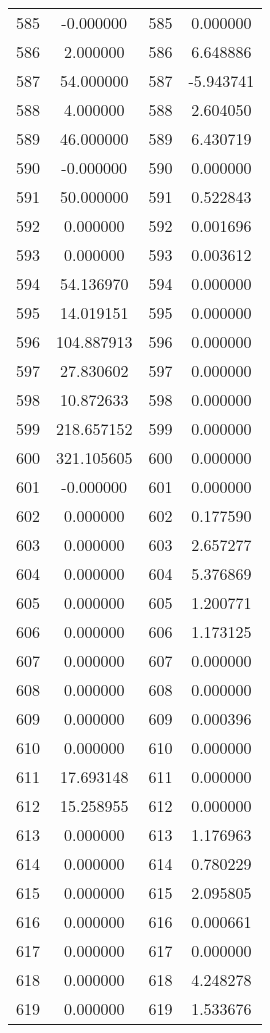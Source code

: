 \documentclass[12pt]{article}
\begin{document}
\begin{longtable}{@{}cccc@{}}
585 & -0.000000 & 585 & 0.000000 \\
586 & 2.000000 & 586 & 6.648886 \\
587 & 54.000000 & 587 & -5.943741 \\
588 & 4.000000 & 588 & 2.604050 \\
589 & 46.000000 & 589 & 6.430719 \\
590 & -0.000000 & 590 & 0.000000 \\
591 & 50.000000 & 591 & 0.522843 \\
592 & 0.000000 & 592 & 0.001696 \\
593 & 0.000000 & 593 & 0.003612 \\
594 & 54.136970 & 594 & 0.000000 \\
595 & 14.019151 & 595 & 0.000000 \\
596 & 104.887913 & 596 & 0.000000 \\
597 & 27.830602 & 597 & 0.000000 \\
598 & 10.872633 & 598 & 0.000000 \\
599 & 218.657152 & 599 & 0.000000 \\
600 & 321.105605 & 600 & 0.000000 \\
601 & -0.000000 & 601 & 0.000000 \\
602 & 0.000000 & 602 & 0.177590 \\
603 & 0.000000 & 603 & 2.657277 \\
604 & 0.000000 & 604 & 5.376869 \\
605 & 0.000000 & 605 & 1.200771 \\
606 & 0.000000 & 606 & 1.173125 \\
607 & 0.000000 & 607 & 0.000000 \\
608 & 0.000000 & 608 & 0.000000 \\
609 & 0.000000 & 609 & 0.000396 \\
610 & 0.000000 & 610 & 0.000000 \\
611 & 17.693148 & 611 & 0.000000 \\
612 & 15.258955 & 612 & 0.000000 \\
613 & 0.000000 & 613 & 1.176963 \\
614 & 0.000000 & 614 & 0.780229 \\
615 & 0.000000 & 615 & 2.095805 \\
616 & 0.000000 & 616 & 0.000661 \\
617 & 0.000000 & 617 & 0.000000 \\
618 & 0.000000 & 618 & 4.248278 \\
619 & 0.000000 & 619 & 1.533676 \\

\end{longtable}
\end{document}
